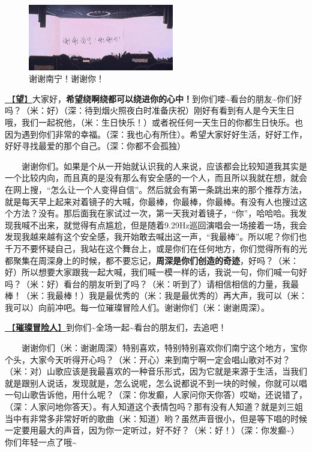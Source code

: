 \documentclass[]{ctexbook}
\begin{document}
\begin{figure}

{\centering \includegraphics[width=180pt]{img/nanning20241206/thank-nanning} 

}

\caption{谢谢南宁！谢谢你！}\label{fig:unnamed-chunk-132}
\end{figure}

\hyperref[hope]{🎵【\textbf{望}】}大家好，\textbf{希望绕啊绕都可以绕进你的心中！}到你们喽\textasciitilde 看台的朋友\textasciitilde 你们好吗？（米：好）（深：待到烟火照夜白时准备庆祝）刚好有看到有人是今天生日哦，我们一起祝他，（米：生日快乐！）或者祝任何一天生日的你都生日快乐。也因为遇到你们非常的幸福。（深：我也心有所住）。希望大家好好生活，好好工作，好好寻找最爱的那个自己。（深：你都不会孤独）

  谢谢你们。如果是个从一开始就认识我的人来说，应该都会比较知道我其实是一个比较内向，而且真的是没有那么有安全感的一个人，而且所以我就在想，就会在网上搜，``怎么让一个人变得自信''。然后就会有第一条跳出来的那个推荐方法，就是每天早上起来对着镜子的大喊，你最棒，你最棒，你最棒。有没有人也搜过这个方法？没有。那后面我在家试过一次，第一天我对着镜子，``你''，哈哈哈。我发现我喊不出来，就觉得有点尴尬，但是随着9.29Hz巡回演唱会一场接着一场，我会发现我越来越有这个安全感，我开始敢去喊出这一声，``我最棒''。所以呢？你们也千万不要怀疑自己，我站在这个舞台上，或是你们在任何地方，你们觉得所有的光都聚集在周深身上的时候，都不要忘记，\textbf{周深是你们创造的奇迹}，好吗？（米：好）所以想要大家跟我一起大喊，我们喊一模一样的话，我说一句，你们喊一句好吗？（米：好）看台的朋友听到了吗？（米：听到了）请相信相信的力量，我最棒！（米：我最棒！）我是最优秀的（米：我是最优秀的）再大声，我可以（米：我可以）向前冲吧。每一位璀璨冒险人们。谢谢你们（米：谢谢周深）。

\hyperref[adventurers]{🎵【\textbf{璀璨冒险人}】}到你们\textasciitilde 全场一起\textasciitilde 看台的朋友们，去追吧！

  谢谢你们（米：谢谢周深）特别喜欢，特别特别喜欢你们南宁这个地方，宝你个头，大家今天听得开心吗？（米：开心）来到南宁啊一定会唱山歌对不对？（米：对）山歌应该是我最喜欢的一种音乐形式，因为它就是来源于生活，当我们就是跟别人说话，发现就是，怎么说呢，怎么说都说不到一块的时候，你就可以唱一句山歌告诉他，用什么呢？（深：你发癫，人家问你天你答）哎呦，还说错了，（深：人家问地你答天）。有人知道这个表情包吗？那有没有人知道？就是刘三姐当中有非常多非常好听的歌曲（米：知道）哟？虽然声音很小，但是等下唱的时候一定要用最大的声音，因为你一定听过，好不好？（米：好！）（深：你发癫\textasciitilde）你们年轻一点了哦\textasciitilde{}
\end{document}
